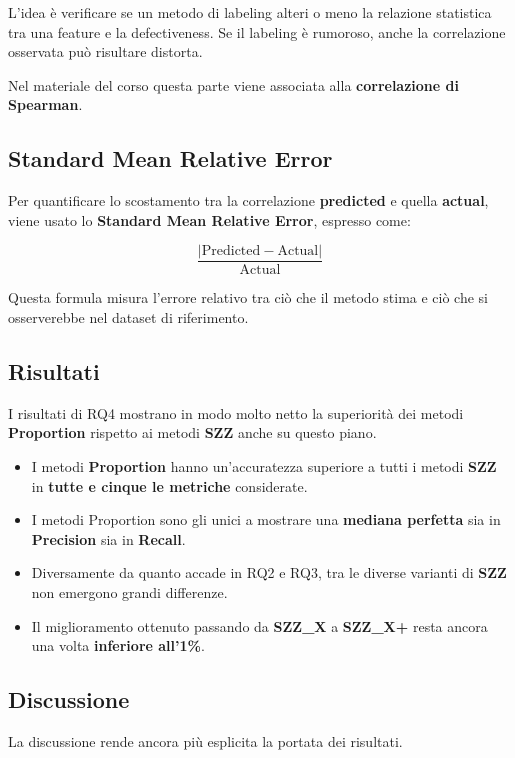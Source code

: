 L'idea è verificare se un metodo di labeling alteri o meno la relazione statistica tra una feature e la defectiveness. Se il labeling è rumoroso, anche la correlazione osservata può risultare distorta.

Nel materiale del corso questa parte viene associata alla \textbf{correlazione di Spearman}.

\subsection{Standard Mean Relative Error}

Per quantificare lo scostamento tra la correlazione \textbf{predicted} e quella \textbf{actual}, viene usato lo \textbf{Standard Mean Relative Error}, espresso come:

\[
\frac{|\text{Predicted} - \text{Actual}|}{\text{Actual}}
\]

Questa formula misura l'errore relativo tra ciò che il metodo stima e ciò che si osserverebbe nel dataset di riferimento.

\subsection{Risultati}

I risultati di RQ4 mostrano in modo molto netto la superiorità dei metodi \textbf{Proportion} rispetto ai metodi \textbf{SZZ} anche su questo piano.

\begin{itemize}
    \item I metodi \textbf{Proportion} hanno un'accuratezza superiore a tutti i metodi \textbf{SZZ} in \textbf{tutte e cinque le metriche} considerate.
    \item I metodi Proportion sono gli unici a mostrare una \textbf{mediana perfetta} sia in \textbf{Precision} sia in \textbf{Recall}.
    \item Diversamente da quanto accade in RQ2 e RQ3, tra le diverse varianti di \textbf{SZZ} non emergono grandi differenze.
    \item Il miglioramento ottenuto passando da \textbf{SZZ\_X} a \textbf{SZZ\_X+} resta ancora una volta \textbf{inferiore all'1\%}.
\end{itemize}

\subsection{Discussione}

La discussione rende ancora più esplicita la portata dei risultati.

